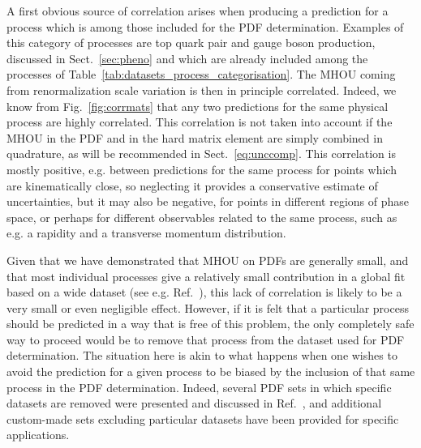 A first obvious source of correlation arises when producing a
prediction for a process which is among those included  for the PDF
determination.
%
Examples of this category of processes are top quark pair and gauge boson production, discussed
in Sect.~\ref{sec:pheno} and which are already included among the processes of
Table~\ref{tab:datasets_process_categorisation}.
%
The MHOU coming from
renormalization scale variation is then in principle
correlated.
%
Indeed, we know from Fig.~\ref{fig:corrmats} that any two
predictions for the same physical process are highly correlated.
%
This correlation is not taken into account if the MHOU in the
PDF and in the hard matrix element are simply combined in quadrature,
as will be recommended in Sect.~\ref{eq:unccomp}.
%
This correlation is mostly positive,
e.g. between predictions for the same process for points which are
kinematically close, so neglecting it provides a conservative estimate
of uncertainties, but it may also be negative, for points in different
regions of phase space, or perhaps for different observables related
to the same process, such as e.g. a rapidity and a transverse momentum
distribution. 

Given that we have demonstrated that MHOU on PDFs are generally small, and that most individual
processes give a relatively small contribution in a global fit based on a wide dataset (see
e.g. Ref.~\cite{Ball:2017nwa}), this lack of correlation is likely to be
a very small or even negligible effect.
%
However, if it is felt that a particular
process should be predicted in a way that is free of this problem, the
only completely safe way to proceed would be to remove that process from the
dataset used for PDF determination.
%
The situation here is akin to what
happens when one wishes to avoid the
prediction for a given process to be biased
by the inclusion of that same process in the PDF determination.
%
Indeed, several
PDF sets in which specific datasets are removed were presented and discussed in
Ref.~\cite{Ball:2017nwa}, and additional custom-made sets excluding particular
datasets have been provided for specific applications.


